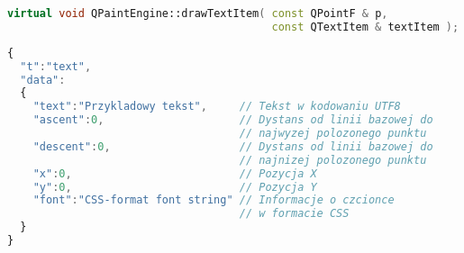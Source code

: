 \begin{lstlisting}[language=C++,numbers=none]
virtual void QPaintEngine::drawTextItem( const QPointF & p, 
                                         const QTextItem & textItem );
\end{lstlisting}
\begin{lstlisting}[language=JavaScript,numbers=none]
{
  "t":"text",
  "data":
  {
    "text":"Przykladowy tekst",     // Tekst w kodowaniu UTF8
    "ascent":0,                     // Dystans od linii bazowej do 
                                    // najwyzej polozonego punktu
    "descent":0,                    // Dystans od linii bazowej do 
                                    // najnizej polozonego punktu
    "x":0,                          // Pozycja X
    "y":0,                          // Pozycja Y
    "font":"CSS-format font string" // Informacje o czcionce 
                                    // w formacie CSS
  }
}
\end{lstlisting}
